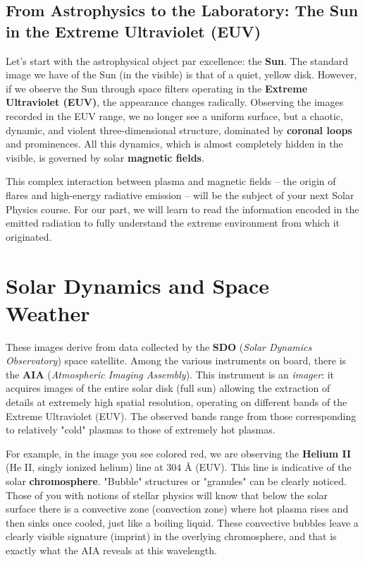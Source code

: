     \subsection{From Astrophysics to the Laboratory: The Sun in the Extreme Ultraviolet (EUV)}
    
    Let's start with the astrophysical object par excellence: the \textbf{Sun}.
    The standard image we have of the Sun (in the visible) is that of a quiet, yellow disk. However, if we observe the Sun through space filters operating in the \textbf{Extreme Ultraviolet (EUV)}, the appearance changes radically.
    Observing the images recorded in the EUV range, we no longer see a uniform surface, but a chaotic, dynamic, and violent three-dimensional structure, dominated by \textbf{coronal loops} and prominences.
    All this dynamics, which is almost completely hidden in the visible, is governed by solar \textbf{magnetic fields}.
    
    This complex interaction between plasma and magnetic fields – the origin of flares and high-energy radiative emission – will be the subject of your next Solar Physics course. For our part, we will learn to read the information encoded in the emitted radiation to fully understand the extreme environment from which it originated.
    
\section{Solar Dynamics and Space Weather}

These images derive from data collected by the \textbf{SDO} (\textit{Solar Dynamics Observatory}) space satellite. Among the various instruments on board, there is the \textbf{AIA} (\textit{Atmospheric Imaging Assembly}). This instrument is an \textit{imager}: it acquires images of the entire solar disk (full sun) allowing the extraction of details at extremely high spatial resolution, operating on different bands of the Extreme Ultraviolet (EUV). The observed bands range from those corresponding to relatively "cold" plasmas to those of extremely hot plasmas.

For example, in the image you see colored red, we are observing the \textbf{Helium II} (He II, singly ionized helium) line at $304\text{ \AA}$ (EUV).
This line is indicative of the solar \textbf{chromosphere}. "Bubble" structures or "granules" can be clearly noticed. Those of you with notions of stellar physics will know that below the solar surface there is a convective zone (convection zone) where hot plasma rises and then sinks once cooled, just like a boiling liquid. These convective bubbles leave a clearly visible signature (imprint) in the overlying chromosphere, and that is exactly what the AIA reveals at this wavelength.

